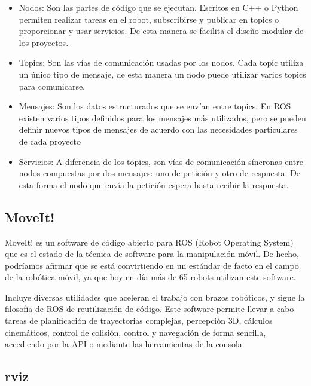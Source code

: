 \begin{itemize}
	\item Nodos: Son las partes de código que se ejecutan. Escritos en C++ o Python permiten realizar tareas en el robot, subscribirse y publicar en topics o proporcionar y usar servicios. De esta manera se facilita el diseño modular de los proyectos.

	\item Topics: Son las vías de comunicación usadas por los nodos. Cada topic utiliza un único tipo de mensaje, de esta manera un nodo puede utilizar varios topics para comunicarse.

	\item Mensajes: Son los datos estructurados que se envían entre topics. En ROS existen varios tipos definidos para los mensajes más utilizados, pero se pueden definir nuevos tipos de mensajes de acuerdo con las necesidades particulares de cada proyecto

	\item Servicios: A diferencia de los topics, son vías de comunicación síncronas entre nodos compuestas por dos mensajes: uno de petición y otro de respuesta. De esta forma  el nodo que envía la petición espera hasta recibir la respuesta.
\end{itemize}

\subsection{MoveIt!}
\label{subsec:plat_moveit}

MoveIt!\cite{moveit}  es un software de código abierto para ROS (Robot Operating System) que es el estado de la técnica de software para la manipulación móvil. De hecho, podríamos afirmar que se está convirtiendo en un estándar de facto en el campo de la robótica móvil, ya que hoy en día más de 65 robots utilizan este software.

Incluye diversas utilidades que aceleran el trabajo con brazos robóticos, y sigue la filosofía de ROS de reutilización de código. Este software permite llevar a cabo tareas de planificación de trayectorias complejas, percepción 3D, cálculos cinemáticos, control de colisión, control y navegación de forma sencilla, accediendo por la API o mediante las herramientas de la consola.


\subsection{rviz}
\label{subsec:plat_rviz}

